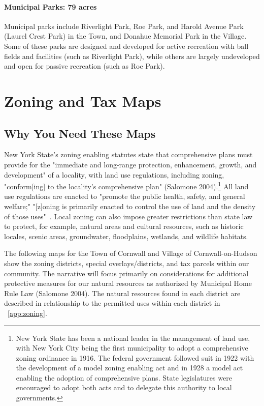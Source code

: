 \paragraph{Municipal Parks: 79 acres}
Municipal parks include Riverlight Park, Roe Park, and Harold Avenue Park 
(Laurel Crest Park) in the Town, and Donahue Memorial Park in the Village. Some 
of these parks are designed and developed for active recreation with ball 
fields and facilities (such as Riverlight Park), while others are largely 
undeveloped and open for passive recreation (such as Roe Park).

\label{map:protectedopenspace}
\section{Zoning and Tax Maps}\label{subsec:zoning}
\subsection*{Why You Need These Maps}
New York State's zoning enabling statutes state that comprehensive plans must 
provide for the "immediate and long-range protection, enhancement, growth, and 
development" of a locality, with land use regulations, including zoning, 
"conform[ing] to the locality's comprehensive plan" (Salomone
2004).\footnote{New York State has been a national leader in the management of
land use, with New York City being the first municipality to adopt a
comprehensive zoning ordinance in 1916. The federal government followed suit in
1922 with the development of a model zoning enabling act and in 1928 a model
act enabling the adoption of comprehensive plans.  State legislatures were
encouraged to adopt both acts and to delegate this authority to local
governments.} All land use regulations are enacted to "promote the public
health, safety, and general welfare;" "[z]oning is primarily enacted to control
the use of land and the density of those uses"~\citep{haeckel2014}.  Local
zoning can also impose greater restrictions than state law to protect, for
example, natural areas and cultural resources, such as historic locales, scenic
areas, groundwater, floodplains, wetlands, and wildlife habitats.

The following maps for the Town of Cornwall and Village of Cornwall-on-Hudson 
show the zoning districts, special overlays/districts, and tax parcels within 
our community. The narrative will focus primarily on considerations for 
additional protective measures for our natural resources as authorized by 
Municipal Home Rule Law (Salomone 2004). The natural resources found in each 
district are described in relationship to the permitted uses within each 
district in ~\ref{app:zoning}.

